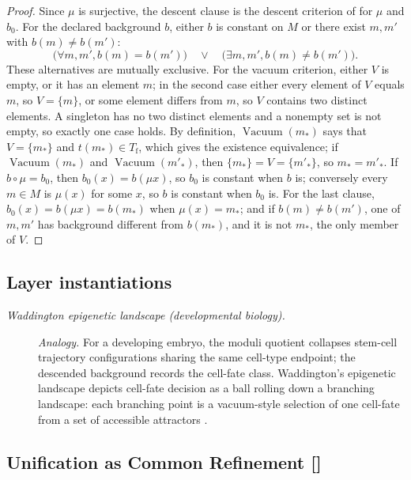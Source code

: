 \begin{proof}
Since \(\mu\) is surjective, the descent clause is the descent criterion
of  for \(\mu\) and \(b_0\).  For the declared background \(b\), either \(b\) is constant on \(M\)
or there exist \(m,m'\) with \(b(m)\ne b(m')\):
\[
  \bigl(\forall m,m', b(m)=b(m')\bigr)
  \quad\vee\quad
  \bigl(\exists m,m', b(m)\ne b(m')\bigr).
\]
These alternatives are mutually exclusive. For the vacuum criterion,
either \(V\) is empty, or it has an element \(m\); in the second case either
every element of \(V\) equals \(m\), so \(V=\{m\}\), or some element differs
from \(m\), so \(V\) contains two distinct elements. A singleton has no two
distinct elements and a nonempty set is not empty, so exactly one case holds.
By definition, \(\operatorname{Vacuum}(m_\ast)\) says that \(V=\{m_\ast\}\) and
\(t(m_\ast)\in T_{\mathrm{f}}\), which gives the existence equivalence; if
\(\operatorname{Vacuum}(m_\ast)\) and \(\operatorname{Vacuum}(m'_\ast)\), then
\(\{m_\ast\}=V=\{m'_\ast\}\), so \(m_\ast=m'_\ast\).
If \(b\circ\mu=b_0\), then \(b_0(x)=b(\mu x)\), so \(b_0\) is constant when
\(b\) is; conversely every \(m\in M\) is \(\mu(x)\) for some \(x\), so \(b\) is
constant when \(b_0\) is. For the last clause, \(b_0(x)=b(\mu x)=b(m_\ast)\) when
\(\mu(x)=m_\ast\); and if \(b(m)\ne b(m')\), one of \(m,m'\) has background
different from \(b(m_\ast)\), and it is not \(m_\ast\), the only member of \(V\).
\end{proof}

\subsection*{Layer instantiations}\label{layer-inst:F50}

\begingroup\small
\begin{description}
\item[\emph{Waddington epigenetic landscape
(developmental biology).}] \textit{Analogy.}
For a developing embryo, the moduli quotient
collapses stem-cell trajectory configurations
sharing the same cell-type endpoint; the
descended background records the cell-fate class.
Waddington's epigenetic landscape depicts cell-fate
decision as a ball rolling down a branching
landscape: each branching point is a vacuum-style
selection of one cell-fate from a set of accessible
attractors \citep{Waddington1957Strategy}.

\end{description}
\endgroup


\subsection{Unification as Common Refinement [\texorpdfstring{}{F51}]}\label{sec:self-reference-limits:unification}

